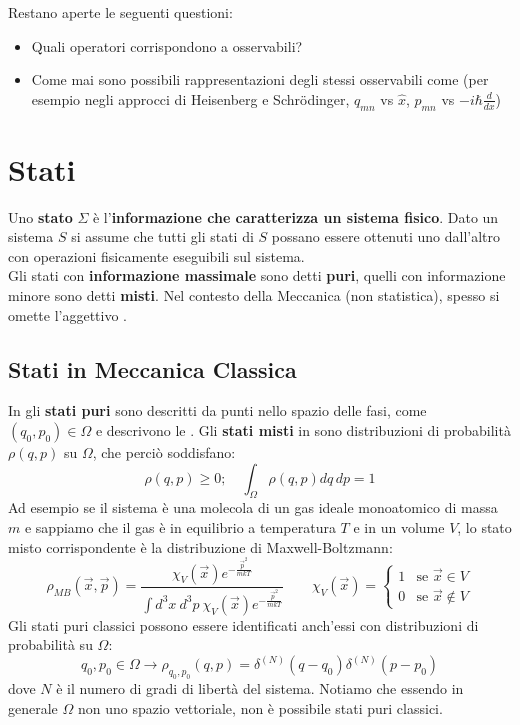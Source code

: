 \documentclass[FisicaTeorica.tex]{subfiles}
\begin{document}
Restano aperte le seguenti questioni:
\begin{itemize}
    \item Quali operatori corrispondono a osservabili?
    \item Come mai sono possibili rappresentazioni degli stessi osservabili come  (per esempio negli approcci di Heisenberg e Schrödinger, $q_{mn}$ vs $\hat{x}$, $p_{mn}$ vs $-i\hbar \frac{d}{dx}$)
\end{itemize}

\section{Stati}
Uno \textbf{stato} $\Sigma$ è l'\textbf{informazione che caratterizza un sistema fisico}. Dato un sistema $S$ si assume che tutti gli stati di $S$ possano essere ottenuti uno dall'altro con operazioni fisicamente eseguibili sul sistema.\\
Gli stati con \textbf{informazione massimale} sono detti \textbf{puri}, quelli con informazione minore sono detti \textbf{misti}. Nel contesto della Meccanica (non statistica), spesso si omette l'aggettivo .

\subsection{Stati in Meccanica Classica}
In \MC gli \textbf{stati puri} sono descritti da punti nello spazio delle fasi, come $(q_0,p_0)\in\Omega$ e descrivono le . 
Gli \textbf{stati misti} in \MC sono distribuzioni di probabilità $\rho(q,p)$ su $\Omega$, che perciò soddisfano:
\[
\rho(q,p)\geq 0; \quad \int_\Omega \rho(q,p) dq\,dp = 1
\]
Ad esempio se il sistema è una molecola di un gas ideale monoatomico di massa $m$ e sappiamo che il gas è in equilibrio a temperatura $T$ e in un volume $V$, lo stato misto corrispondente è la distribuzione di Maxwell-Boltzmann:
\[\rho_{MB}\left(\vec{x},\vec{p}\right)=\frac{\chi_V\left(\vec{x}\right)e^{-\frac{{\vec{p}}^2}{mkT}}}{\int d^3x\ d^3p\ \chi_V\left(\vec{x}\right)e^{-\frac{{\vec{p}}^2}{mkT}}}\quad \quad \chi_V(\vec{x}) = \begin{cases}
1 & \text{se }\vec{x}\in V\\
0 & \text{se }\vec{x}\notin V
\end{cases}
\]
Gli stati puri classici possono essere identificati anch'essi con distribuzioni di probabilità  su $\Omega$:
\[
q_0,p_0\in\Omega\rightarrow\rho_{q_0,p_0}\left(q,p\right)=\delta^{\left(N\right)}\left(q-q_0\right)\delta^{\left(N\right)}\left(p-p_0\right)
\]
dove $N$ è il numero di gradi di libertà del sistema.
Notiamo che essendo in generale $\Omega$ non uno spazio vettoriale, non è possibile  stati puri classici.\\
\end{document}
